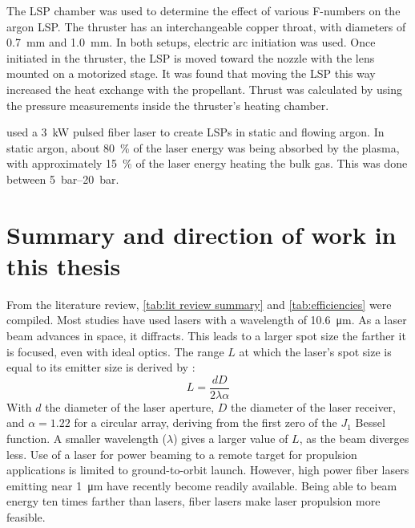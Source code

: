         The LSP chamber was used to determine the effect of various F-numbers on the argon LSP. The thruster has an interchangeable copper throat, with diameters of \qty{0.7}{mm} and \qty{1.0}{mm}. In both setups, electric arc initiation was used. Once initiated in the thruster, the LSP is moved toward the nozzle with the lens mounted on a motorized stage. It was found that moving the LSP this way increased the heat exchange with the propellant. Thrust was calculated by using the pressure measurements inside the thruster's heating chamber.


        \textcite{duplayArgonLaserPlasmaThruster2024a} used a \qty{3}{kW} pulsed fiber laser to create LSPs in static and flowing argon. In static argon, about \qty{80}{\%} of the laser energy was being absorbed by the plasma, with approximately \qty{15}{\%} of the laser energy heating the bulk gas. This was done between \qtyrange{5}{20}{bar}.

    \section{Summary and direction of work in this thesis}
        
        From the literature review, \autoref{tab:lit review summary} and \autoref{tab:efficiencies} were compiled. Most studies have used  lasers with a wavelength of \qty{10.6}{μm}. As a laser beam advances in space, it diffracts. This leads to a larger spot size the farther it is focused, even with ideal optics. The range $L$ at which the laser's spot size is equal to its emitter size is derived by \textcite{lubinRoadmapInterstellarFlight2016}:
        \[
            L = \frac{dD}{2\lambda\alpha}
        \]
        With $d$ the diameter of the laser aperture, $D$ the diameter of the laser receiver, and $\alpha = 1.22$ for a circular array, deriving from the first zero of the $J_1$ Bessel function. A smaller wavelength ($\lambda$) gives a larger value of $L$, as the beam diverges less. Use of a  laser for power beaming to a remote target for propulsion applications is limited to ground-to-orbit launch. However, high power fiber lasers emitting near \qty{1}{μm} have recently become readily available. Being able to beam energy ten times farther than  lasers, fiber lasers make laser propulsion more feasible.

